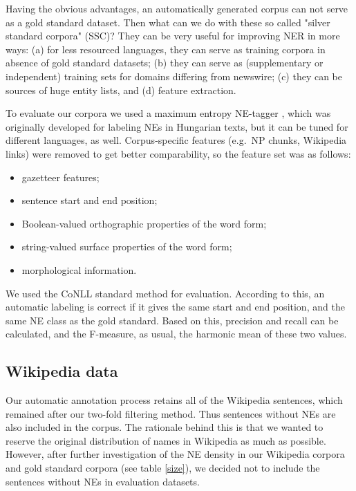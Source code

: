 \documentclass[11pt]{article}
\begin{document}

Having the obvious advantages, an automatically generated corpus can not serve as a gold standard dataset. Then what can we do with these so called "silver standard corpora" (SSC)? They can be very useful for improving NER in more ways: (a) for less resourced languages, they can serve as training corpora in absence of gold standard datasets; (b) they can serve as (supplementary or independent) training sets for domains differing from newswire; (c) they can be sources of huge entity lists, and (d) feature extraction. 

To evaluate our corpora we used a maximum entropy NE-tagger \cite{Varga:07}, which was originally developed for labeling NEs in Hungarian texts, but it can be tuned for different languages, as well. Corpus-specific features (e.g.~NP chunks, Wikipedia links) were removed to get better comparability, so the feature set was as follows:

\begin{itemize}
\item gazetteer features;
\item sentence start and end position;
\item Boolean-valued orthographic properties of the word form;
\item string-valued surface properties of the word form;
\item morphological information.
\end{itemize}

We used the CoNLL standard method for evaluation. According to this, an automatic labeling is correct if it gives the same start and end position, and the same NE class as the gold standard. Based on this, precision and recall can be calculated, and the F-measure, as usual, the harmonic mean of these two values.  

\subsection{Wikipedia data}

Our automatic annotation process retains all of the Wikipedia sentences, which remained after our two-fold filtering method. Thus sentences without NEs are also included in the corpus. The rationale behind this is that we wanted to reserve the original distribution of names in Wikipedia as much as possible. However, after further investigation of the NE density in our Wikipedia corpora and gold standard corpora (see table \ref{size}), we decided not to include the sentences without NEs in evaluation datasets. 
\end{document}
